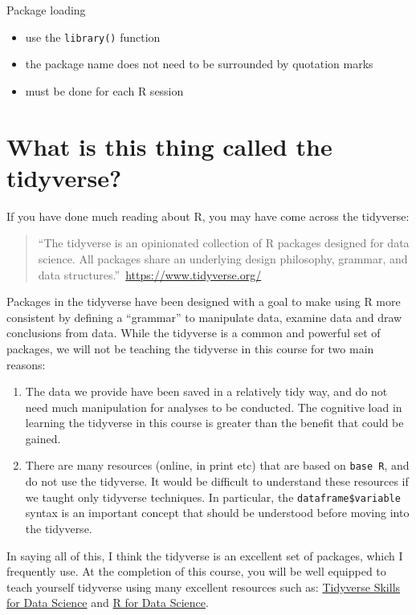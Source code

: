 \documentclass[
]{memoir}
\providecommand{\tightlist}{%
  \setlength{\itemsep}{0pt}\setlength{\parskip}{0pt}}
\begin{document}
Package loading

\begin{itemize}
\tightlist
\item
  use the \texttt{library()} function
\item
  the package name does not need to be surrounded by quotation marks
\item
  must be done for each R session
\end{itemize}

\hypertarget{what-is-this-thing-called-the-tidyverse}{%
\section{What is this thing called the tidyverse?}\label{what-is-this-thing-called-the-tidyverse}}

If you have done much reading about R, you may have come across the tidyverse:

\begin{quote}
``The tidyverse is an opinionated collection of R packages designed for data science. All packages share an underlying design philosophy, grammar, and data structures.''~\url{https://www.tidyverse.org/}
\end{quote}

Packages in the tidyverse have been designed with a goal to make using R more consistent by defining a ``grammar'' to manipulate data, examine data and draw conclusions from data. While the tidyverse is a common and powerful set of packages, we will not be teaching the tidyverse in this course for two main reasons:

\begin{enumerate}
\def\labelenumi{\arabic{enumi}.}
\tightlist
\item
  The data we provide have been saved in a relatively tidy way, and do not need much manipulation for analyses to be conducted. The cognitive load in learning the tidyverse in this course is greater than the benefit that could be gained.
\item
  There are many resources (online, in print etc) that are based on \texttt{base\ R}, and do not use the tidyverse. It would be difficult to understand these resources if we taught only tidyverse techniques. In particular, the \texttt{dataframe\$variable} syntax is an important concept that should be understood before moving into the tidyverse.
\end{enumerate}

In saying all of this, I think the tidyverse is an excellent set of packages, which I frequently use. At the completion of this course, you will be well equipped to teach yourself tidyverse using many excellent resources such as: \href{https://jhudatascience.org/tidyversecourse/}{Tidyverse Skills for Data Science} and \href{https://r4ds.had.co.nz/}{R for Data Science}.
\end{document}
